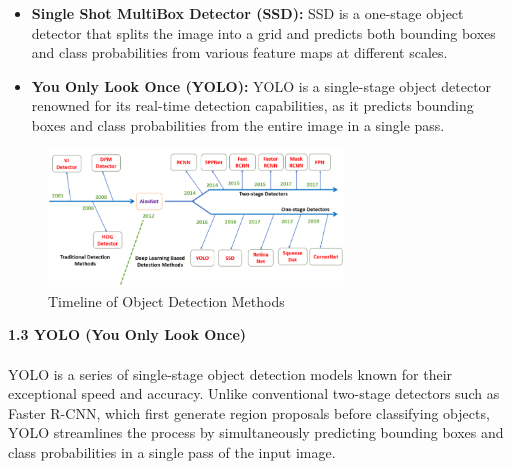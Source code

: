 \begin{itemize}
\begin{itemize}
    \item \textbf{Single Shot MultiBox Detector (SSD):} SSD is a one-stage object detector that splits the image into a grid and predicts both bounding boxes and class probabilities from various feature maps at different scales.
    \item \textbf{You Only Look Once (YOLO):} YOLO is a single-stage object detector renowned for its real-time detection capabilities, as it predicts bounding boxes and class probabilities from the entire image in a single pass.
  \end{itemize}
  \begin{figure}[h!]
    \centering
    \includegraphics[width=0.7\textwidth]{images/Timeline.png}
    \caption{Timeline of Object Detection Methods}
    \label{fig:enter-label}
  \end{figure}
\end{itemize}
%
{ \textbf{1.3 {YOLO (You Only Look Once)}}}\\\\
%
YOLO is a series of single-stage object detection models known for their exceptional speed and accuracy. Unlike conventional two-stage detectors such as Faster R-CNN, which first generate region proposals before classifying objects, YOLO streamlines the process by simultaneously predicting bounding boxes and class probabilities in a single pass of the input image.
\\\newline
